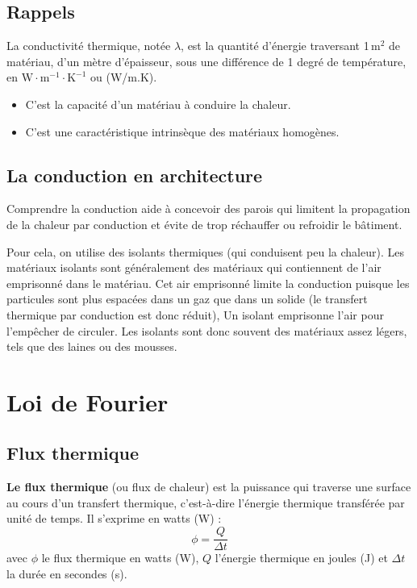 \subsection*{Rappels}
La conductivité thermique, notée $\lambda$, est la quantité d'énergie traversant 1\,m$^2$ de matériau, d'un mètre d'épaisseur, sous une différence de 1 degré de température, en $\mathrm{W\cdot m^{-1}\cdot K^{-1}}$ ou (W/m.K).
\begin{itemize}
  \item C'est la capacité d'un matériau à conduire la chaleur.
  \item C'est une caractéristique intrinsèque des matériaux homogènes.
\end{itemize}

\subsection*{La conduction en architecture}
Comprendre la conduction aide à concevoir des parois qui limitent la propagation de la chaleur par conduction et évite de trop réchauffer ou refroidir le bâtiment.

Pour cela, on utilise des isolants thermiques (qui conduisent peu la chaleur). Les matériaux isolants sont généralement des matériaux qui contiennent de l'air emprisonné dans le matériau. Cet air emprisonné limite la conduction puisque les particules sont plus espacées dans un gaz que dans un solide (le transfert thermique par conduction est donc réduit), Un isolant emprisonne l’air pour l’empêcher de circuler. Les isolants sont donc souvent des matériaux assez légers, tels que des laines ou des mousses.

\section{Loi de Fourier}

\subsection*{Flux thermique}
\textbf{Le flux thermique} (ou flux de chaleur) est la puissance qui traverse une surface au cours d'un transfert thermique, c'est-à-dire l'énergie thermique transférée par unité de temps. Il s'exprime en watts (W) :
\begin{equation}
  \phi = \frac{Q}{\Delta t}
\end{equation}
avec $\phi$ le flux thermique en watts (W), $Q$ l'énergie thermique en joules (J) et $\Delta t$ la durée en secondes (s).

